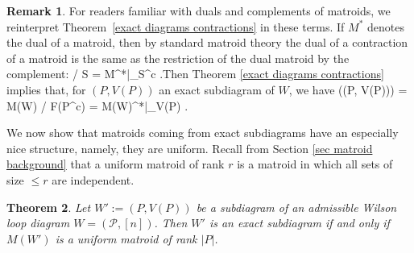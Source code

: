 \documentclass[11pt]{article}
\def\bas #1\eas{\begin{align*} #1 \end{align*}}
\newcommand{\cP}{\mathcal{P}}
\newtheorem{thm}{Theorem}[section]
\theoremstyle{remark}
\theoremstyle{definition}
\newtheorem{rmk}[thm]{Remark}
\begin{document}
\begin{rmk} \label{remark exact dual restiction} For readers familiar with duals and complements of matroids, we reinterpret Theorem~\ref{exact diagrams contractions} in these terms. If $M^*$ denotes the dual of a matroid, then by standard matroid theory \cite{OxleyMatroidBook} the dual of a contraction of a matroid is the same as the restriction of the dual matroid by the complement: \bas M / S = M^*|_{S^c} \;.\eas Then Theorem \ref{exact diagrams contractions} implies that, for $(P, V(P))$ an exact subdiagram of $W$, we have \bas M\big((P, V(P))\big) = M(W)  / F(P^c) = M(W)^*|_{V(P)} \;.\eas
\end{rmk}

We now show that matroids coming from exact subdiagrams have an especially nice structure, namely, they are uniform. Recall from Section \ref{sec matroid background} that a uniform matroid of rank $r$ is a matroid in which all sets of size $ \leq r$ are independent.


\begin{thm} \label{exactuniformthm}
Let $W':= (P, V(P))$ be a subdiagram of an admissible Wilson loop diagram $W= (\cP, [n])$. Then $W'$ is an exact subdiagram if and only if $M(W')$ is a uniform matroid of rank $|P|$.
\end{thm}
\end{document}
